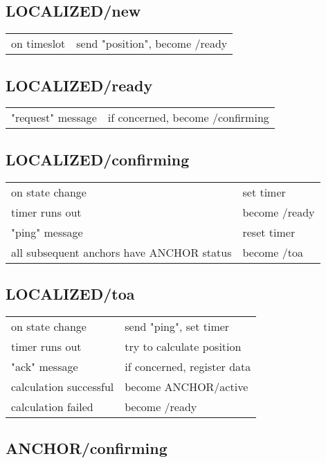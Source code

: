 \documentclass[12pt,a4paper,fleqn]{report}
\begin{document}
\begin{appendices}
\subsection*{LOCALIZED/new}

\begin{tabular}{p{5cm}p{10cm}}
	on timeslot			& send "position", become /ready \\
\end{tabular}

\subsection*{LOCALIZED/ready}

\begin{tabular}{p{5cm}p{10cm}}
	"request" message	& if concerned, become /confirming \\
\end{tabular}

\subsection*{LOCALIZED/confirming}

\begin{tabular}{p{5cm}p{10cm}}
	on state change		& set timer \\
	timer runs out		& become /ready \\
	"ping" message		& reset timer \\
	all subsequent anchors have ANCHOR status & become /toa
\end{tabular}

\subsection*{LOCALIZED/toa}

\begin{tabular}{p{5cm}p{10cm}}
	on state change		& send "ping", set timer \\
	timer runs out		& try to calculate position \\
	"ack" message		& if concerned, register data \\
	calculation successful	& become ANCHOR/active \\
	calculation failed		& become /ready
\end{tabular}

\subsection*{ANCHOR/confirming}


\end{appendices}
\end{document}
